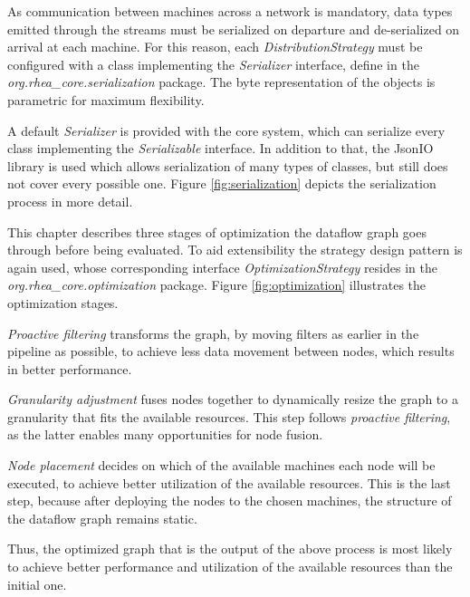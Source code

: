 \documentclass{dithesis}
\begin{document}

As communication between machines across a network is mandatory, data types emitted through the streams must be serialized on departure and de-serialized on arrival at each machine. For this reason, each \textit{DistributionStrategy} must be configured with a class implementing the \textit{Serializer} interface, define in the \textit{org.rhea\_core.serialization} package. The byte representation of the objects is parametric for maximum flexibility. 

A default \textit{Serializer} is provided with the core system, which can serialize every class implementing the \textit{Serializable} interface. In addition to that, the JsonIO library\cite{json_io} is used which allows serialization of many types of classes, but still does not cover every possible one. Figure \ref{fig:serialization} depicts the serialization process in more detail.



This chapter describes three stages of optimization the dataflow graph goes through before being evaluated. To aid extensibility  the strategy design pattern is again used, whose corresponding interface \textit{OptimizationStrategy} resides in the \textit{org.rhea\_core.optimization} package. Figure \ref{fig:optimization} illustrates the optimization stages.


\textit{Proactive filtering} transforms the graph, by moving filters as earlier in the pipeline as possible, to achieve less data movement between nodes, which results in better performance.

\textit{Granularity adjustment} fuses nodes together to dynamically resize the graph to a granularity that fits the available resources. This step follows \textit{proactive filtering}, as the latter enables many opportunities for node fusion.

\textit{Node placement} decides on which of the available machines each node will be executed, to achieve better utilization of the available resources. This is the last step, because after deploying the nodes to the chosen machines, the structure of the dataflow graph remains static.

Thus, the optimized graph that is the output of the above process is most likely to achieve better performance and utilization of the available resources than the initial one.
\end{document}

